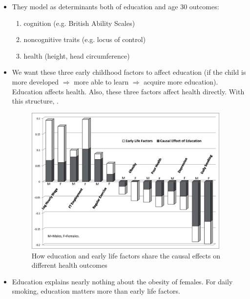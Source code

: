 \begin{itemize}
\begin{enumerate}
        \end{enumerate}
        \item They model  as determinants both of education and age 30 outcomes:
        \begin{enumerate}
            \item cognition (e.g. British Ability Scales)
            \item noncognitive traits (e.g. locus of control)
            \item health (height, head circumference)
            \end{enumerate}
          \item We want these three early childhood factors to affect education (if the child is more developed $\Rightarrow$ more able to learn $\Rightarrow$ acquire more education).  Education affects health. Also, these three factors affect health directly. With this structure,  .

          
\begin{figure}[H]%
                \centering
                \includegraphics[width=4in]{images/ch3/44.png}
                \caption{How education and early life factors share the causal effects on different health outcomes}
            \end{figure}        
\end{itemize}

\begin{itemize}
\item Education explains nearly nothing about the obesity of females. For daily smoking, education matters more than early life factors.
\end{itemize}

